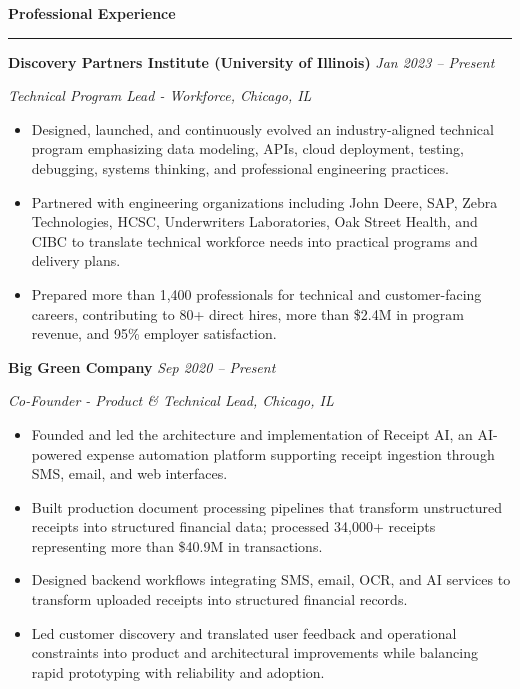 \documentclass[letterpaper,9pt]{extarticle}
\newcommand{\resheading}[1]{
  \vspace{15pt}
  \textbf{\large #1}
  \vspace{5pt}
  \hrule
  \vspace{10pt}
}
\newcommand{\roleheading}[3]{
  \Needspace{6\baselineskip}
  \textbf{#1}
  \hfill
  \textit{#2}

  \emph{#3}
}
\begin{document}
\resheading{Professional Experience}

\roleheading
  {Discovery Partners Institute (University of Illinois)}
  {Jan 2023 -- Present}
  {Technical Program Lead - Workforce, Chicago, IL}

\begin{itemize}
\item Designed, launched, and continuously evolved an industry-aligned technical program emphasizing data modeling, APIs, cloud deployment, testing, debugging, systems thinking, and professional engineering practices.
\item Partnered with engineering organizations including John Deere, SAP, Zebra Technologies, HCSC, Underwriters Laboratories, Oak Street Health, and CIBC to translate technical workforce needs into practical programs and delivery plans.
\item Prepared more than 1,400 professionals for technical and customer-facing careers, contributing to 80+ direct hires, more than \$2.4M in program revenue, and 95\% employer satisfaction.
\end{itemize}

\vspace{3pt}

\roleheading
  {Big Green Company}
  {Sep 2020 -- Present}
  {Co-Founder - Product \& Technical Lead, Chicago, IL}

\begin{itemize}
\item Founded and led the architecture and implementation of Receipt AI, an AI-powered expense automation platform supporting receipt ingestion through SMS, email, and web interfaces.
\item Built production document processing pipelines that transform unstructured receipts into structured financial data; processed 34,000+ receipts representing more than \$40.9M in transactions.
\item Designed backend workflows integrating SMS, email, OCR, and AI services to transform uploaded receipts into structured financial records.
\item Led customer discovery and translated user feedback and operational constraints into product and architectural improvements while balancing rapid prototyping with reliability and adoption.
\end{itemize}

\vspace{3pt}
\end{document}

